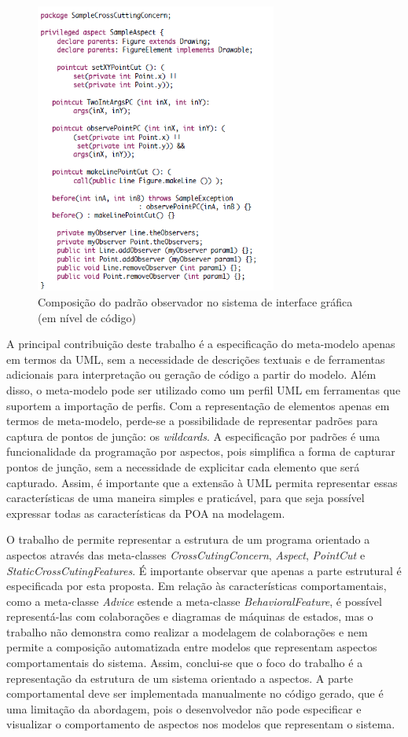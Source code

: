 \begin{figure}
	\centering
	\includegraphics[width=300px]{img/p21_code.png}
	\caption{Composição do padrão observador no sistema de interface gráfica (em nível de código)}\label{fig:p21_code}
\end{figure}

A principal contribuição deste trabalho é a especificação do meta-modelo apenas em termos da UML, sem a necessidade de descrições textuais e de
ferramentas adicionais para interpretação ou geração de código a partir do modelo. Além disso, o meta-modelo pode ser utilizado como um perfil UML em
ferramentas que suportem a importação de perfis. Com a representação de elementos apenas em termos de meta-modelo, perde-se a possibilidade de
representar padrões para captura de pontos de junção: os \textit{wildcards}. A especificação por padrões é uma funcionalidade da programação por aspectos, pois simplifica a forma de capturar pontos de junção, sem a necessidade de explicitar cada elemento que
será capturado. Assim, é importante que a extensão à UML permita representar essas características de uma maneira simples e praticável, para que seja
possível expressar todas as características da POA na modelagem.

O trabalho de \cite{Evermann:2007:MSP:1229375.1229379} permite representar a estrutura de um programa orientado a aspectos através das meta-classes
\textit{CrossCutingConcern}, \textit{Aspect}, \textit{PointCut} e \textit{StaticCrossCutingFeatures}. É importante observar que apenas a parte
estrutural é especificada por esta proposta. Em relação às características comportamentais, como a meta-classe \textit{Advice} estende a meta-classe
\textit{BehavioralFeature}, é possível representá-las com colaborações e diagramas de máquinas de estados, mas o trabalho não demonstra como realizar
a modelagem de colaborações e nem permite a composição automatizada entre modelos que representam aspectos comportamentais do sistema. Assim,
conclui-se que o foco do trabalho é a representação da estrutura de um sistema orientado a aspectos. A parte comportamental deve ser implementada
manualmente no código gerado, que é uma limitação da abordagem, pois o desenvolvedor não pode especificar e visualizar o comportamento de aspectos nos
modelos que representam o sistema.

